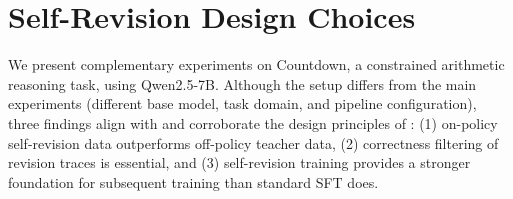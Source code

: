 \section{Self-Revision Design Choices}
\label{app:countdown}



We present complementary experiments on Countdown, a constrained arithmetic reasoning task, using Qwen2.5-7B. Although the setup differs from the main experiments (different base model, task domain, and pipeline configuration), three findings align with and corroborate the design principles of \ours{}: (1) on-policy self-revision data outperforms off-policy teacher data, (2) correctness filtering of revision traces is essential, and (3) self-revision training provides a stronger foundation for subsequent training than standard SFT does.

